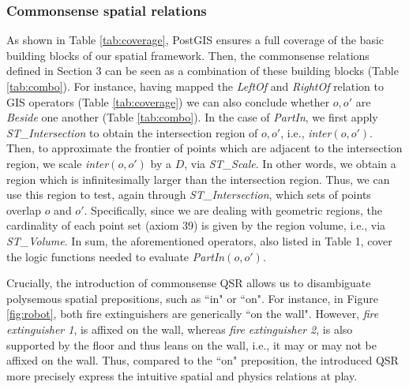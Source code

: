 \documentclass{article}
\begin{document}
\subsubsection{Commonsense spatial relations} As shown in Table \ref{tab:coverage}, PostGIS ensures a full coverage of the basic building blocks of our spatial framework. Then, the commonsense relations defined in Section 3 can be seen as a combination of these building blocks (Table \ref{tab:combo}). For instance, having mapped the \textit{LeftOf} and \textit{RightOf} relation to GIS operators (Table \ref{tab:coverage}) we can also conclude whether $o,o'$ are \textit{Beside} one another (Table \ref{tab:combo}). In the case of \textit{PartIn}, we first apply \textit{ST\_Intersection} to obtain the intersection region of $o,o'$, i.e., \textit{inter}$(o,o')$. Then, to approximate the frontier of points which are adjacent to the intersection region, we scale \textit{inter}$(o,o')$ by a $D$, via \textit{ST\_Scale}. In other words, we obtain a region which is infinitesimally larger than the intersection region. Thus, we can use this  region to test, again through \textit{ST\_Intersection}, which sets of points overlap $o$ and $o'$. Specifically, since we are dealing with geometric regions, the cardinality of each point set (axiom 39) is given by the region volume, i.e., via \textit{ST\_Volume}. In sum, the aforementioned operators, also listed in Table 1, cover the logic functions needed to evaluate \textit{PartIn}$(o,o')$. 

Crucially, the introduction of commonsense QSR allows us to disambiguate polysemous spatial prepositions, such as ``in" or ``on". For instance, in Figure \ref{fig:robot}, both fire extinguishers are generically ``on the wall". However, \textit{fire extinguisher 1}, is affixed on the wall, whereas  \textit{fire extinguisher 2}, is also supported by the floor and thus leans on the wall, i.e., it may or may not be affixed on the wall. Thus, compared to the ``on" preposition, the introduced QSR more precisely express the intuitive spatial and physics relations at play.  %
\end{document}
